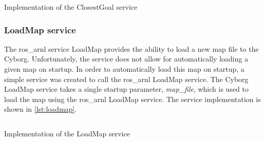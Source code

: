 \documentclass[\rootfolder/main.tex]{subfiles}
\begin{document}
\begin{listing}
    \inputminted[fontsize=\scriptsize]{python}{\rootfolder/Chapters/Chapter6/Listings/closest_goal.py}
    \caption{Implementation of the ClosestGoal service \label{lst:closestgoal}}
\end{listing}

\subsubsection{LoadMap service}

The ros\_arnl service LoadMap provides the ability to load a new map file to the Cyborg.
Unfortunately, the service does not allow for automatically loading a given map on startup.
In order to automatically load this map on startup, a simple service was created to call the ros\_arnl LoadMap service.
The Cyborg LoadMap service takes a single startup parameter, \emph{map\_file}, which is used to load the map using the ros\_arnl LoadMap service.
The service implementation is shown in \cref{lst:loadmap}.

\begin{listing}
    \inputminted[fontsize=\scriptsize]{python}{\rootfolder/Chapters/Chapter6/Listings/load_map.py}
    \caption{Implementation of the LoadMap service \label{lst:loadmap}}
\end{listing}
\end{document}
